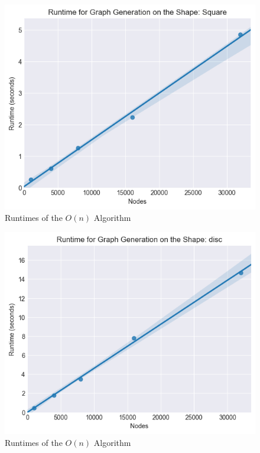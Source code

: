 \documentclass{article}
\begin{document}
  \begin{figure}[H]
    \centering
    \includegraphics[width=1 \textwidth]{square/runtime/runtime_chart}
    \caption{Runtimes of the $O(n)$ Algorithm}
  \end{figure}

  \begin{figure}[H]
    \centering
    \includegraphics[width=1 \textwidth]{disc/runtime/runtime_chart}
    \caption{Runtimes of the $O(n)$ Algorithm}
  \end{figure}


\printbibliography
\end{document}
